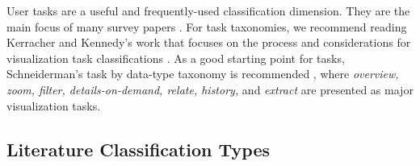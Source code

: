 User tasks are a useful and frequently-used classification dimension. They are the main focus of many survey papers \cite{ahn2014task, brehmer2013multi, schulz2013design}. For task taxonomies, we recommend reading Kerracher and Kennedy's work that focuses on the process and considerations for visualization task classifications \cite{kerracher2017constructing}. As a good starting point for tasks, Schneiderman's task by data-type taxonomy is recommended \cite{shneiderman1996eyes}, where \textit{overview, zoom, filter, details-on-demand, relate, history,} and \textit{extract} are presented as major visualization tasks.

\subsection{Literature Classification Types }
